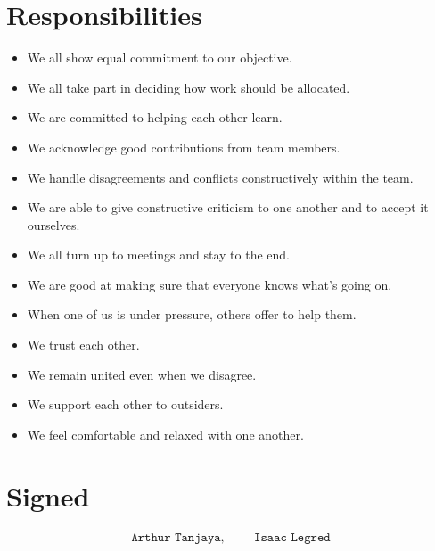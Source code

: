 \documentclass{article}
\begin{document}
\section{Responsibilities}

\begin{itemize}
\item We all show equal commitment to our objective.
\item We all take part in deciding how work should be allocated.
\item We are committed to helping each other learn.
\item We acknowledge good contributions from team members.
\item We handle disagreements and conflicts constructively within the team.
\item We are able to give constructive criticism to one another and to accept it ourselves.
\item We all turn up to meetings and stay to the end.
\item We are good at making sure that everyone knows what’s going on.
\item When one of us is under pressure, others offer to help them.
\item We trust each other.
\item We remain united even when we disagree.
\item We support each other to outsiders.
\item We feel comfortable and relaxed with one another.
\end{itemize}

\section*{Signed}

\Huge
\begin{align*}
\texttt{Arthur Tanjaya},
& & &
\texttt{Isaac Legred}
\end{align*}
\end{document}

